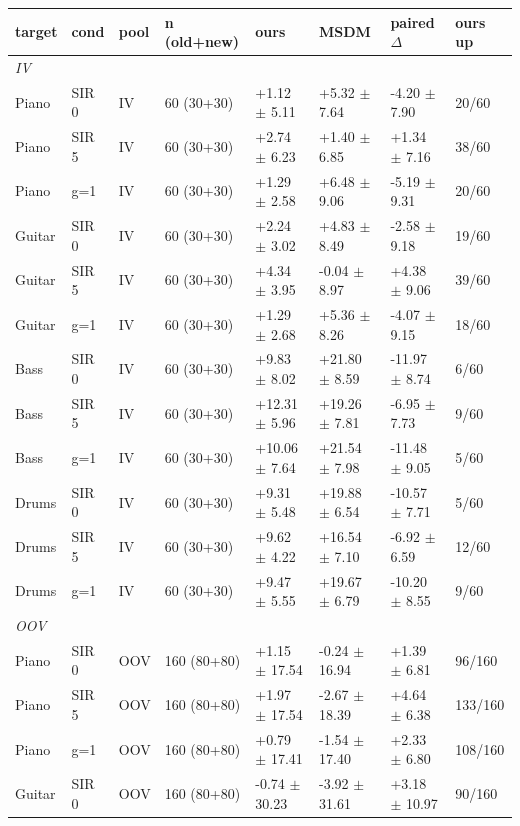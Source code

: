 \begin{tabular}{llllllll}
\toprule
target & cond & pool & n (old+new) & ours & MSDM & paired $\Delta$ & ours up\\
\midrule
\multicolumn{8}{l}{\emph{IV}}\\
Piano & SIR 0 & IV & 60 (30+30) & +1.12 $\pm$ 5.11 & +5.32 $\pm$ 7.64 & -4.20 $\pm$ 7.90 & 20/60\\
Piano & SIR 5 & IV & 60 (30+30) & +2.74 $\pm$ 6.23 & +1.40 $\pm$ 6.85 & +1.34 $\pm$ 7.16 & 38/60\\
Piano & g=1 & IV & 60 (30+30) & +1.29 $\pm$ 2.58 & +6.48 $\pm$ 9.06 & -5.19 $\pm$ 9.31 & 20/60\\
Guitar & SIR 0 & IV & 60 (30+30) & +2.24 $\pm$ 3.02 & +4.83 $\pm$ 8.49 & -2.58 $\pm$ 9.18 & 19/60\\
Guitar & SIR 5 & IV & 60 (30+30) & +4.34 $\pm$ 3.95 & -0.04 $\pm$ 8.97 & +4.38 $\pm$ 9.06 & 39/60\\
Guitar & g=1 & IV & 60 (30+30) & +1.29 $\pm$ 2.68 & +5.36 $\pm$ 8.26 & -4.07 $\pm$ 9.15 & 18/60\\
Bass & SIR 0 & IV & 60 (30+30) & +9.83 $\pm$ 8.02 & +21.80 $\pm$ 8.59 & -11.97 $\pm$ 8.74 & 6/60\\
Bass & SIR 5 & IV & 60 (30+30) & +12.31 $\pm$ 5.96 & +19.26 $\pm$ 7.81 & -6.95 $\pm$ 7.73 & 9/60\\
Bass & g=1 & IV & 60 (30+30) & +10.06 $\pm$ 7.64 & +21.54 $\pm$ 7.98 & -11.48 $\pm$ 9.05 & 5/60\\
Drums & SIR 0 & IV & 60 (30+30) & +9.31 $\pm$ 5.48 & +19.88 $\pm$ 6.54 & -10.57 $\pm$ 7.71 & 5/60\\
Drums & SIR 5 & IV & 60 (30+30) & +9.62 $\pm$ 4.22 & +16.54 $\pm$ 7.10 & -6.92 $\pm$ 6.59 & 12/60\\
Drums & g=1 & IV & 60 (30+30) & +9.47 $\pm$ 5.55 & +19.67 $\pm$ 6.79 & -10.20 $\pm$ 8.55 & 9/60\\
\midrule
\multicolumn{8}{l}{\emph{OOV}}\\
Piano & SIR 0 & OOV & 160 (80+80) & +1.15 $\pm$ 17.54 & -0.24 $\pm$ 16.94 & +1.39 $\pm$ 6.81 & 96/160\\
Piano & SIR 5 & OOV & 160 (80+80) & +1.97 $\pm$ 17.54 & -2.67 $\pm$ 18.39 & +4.64 $\pm$ 6.38 & 133/160\\
Piano & g=1 & OOV & 160 (80+80) & +0.79 $\pm$ 17.41 & -1.54 $\pm$ 17.40 & +2.33 $\pm$ 6.80 & 108/160\\
Guitar & SIR 0 & OOV & 160 (80+80) & -0.74 $\pm$ 30.23 & -3.92 $\pm$ 31.61 & +3.18 $\pm$ 10.97 & 90/160\\

\end{tabular}
